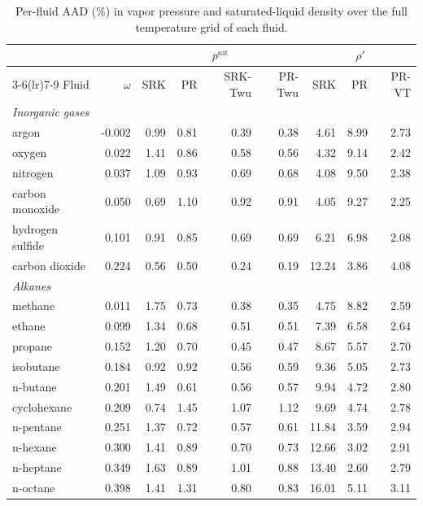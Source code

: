 \begin{table}[H]
\centering
\caption{Per-fluid AAD (\%) in vapor pressure and saturated-liquid density over the full temperature grid of each fluid.}
\label{tab:perfluid}
\footnotesize
\setlength{\tabcolsep}{4pt}
\begin{tabular}{lrrrrrrrr}
\toprule
 & & \multicolumn{4}{c}{$p^{\mathrm{sat}}$} & \multicolumn{3}{c}{$\rho'$} \\
\cmidrule(lr){3-6}\cmidrule(lr){7-9}
Fluid & $\omega$ & SRK & PR & SRK-Twu & PR-Twu & SRK & PR & PR-VT \\
\midrule
\multicolumn{9}{l}{\itshape Inorganic gases}\\
\quad argon & -0.002 & 0.99 & 0.81 & 0.39 & 0.38 & 4.61 & 8.99 & 2.73 \\
\quad oxygen & 0.022 & 1.41 & 0.86 & 0.58 & 0.56 & 4.32 & 9.14 & 2.42 \\
\quad nitrogen & 0.037 & 1.09 & 0.93 & 0.69 & 0.68 & 4.08 & 9.50 & 2.38 \\
\quad carbon monoxide & 0.050 & 0.69 & 1.10 & 0.92 & 0.91 & 4.05 & 9.27 & 2.25 \\
\quad hydrogen sulfide & 0.101 & 0.91 & 0.85 & 0.69 & 0.69 & 6.21 & 6.98 & 2.08 \\
\quad carbon dioxide & 0.224 & 0.56 & 0.50 & 0.24 & 0.19 & 12.24 & 3.86 & 4.08 \\
\multicolumn{9}{l}{\itshape Alkanes}\\
\quad methane & 0.011 & 1.75 & 0.73 & 0.38 & 0.35 & 4.75 & 8.82 & 2.59 \\
\quad ethane & 0.099 & 1.34 & 0.68 & 0.51 & 0.51 & 7.39 & 6.58 & 2.64 \\
\quad propane & 0.152 & 1.20 & 0.70 & 0.45 & 0.47 & 8.67 & 5.57 & 2.70 \\
\quad isobutane & 0.184 & 0.92 & 0.92 & 0.56 & 0.59 & 9.36 & 5.05 & 2.73 \\
\quad n-butane & 0.201 & 1.49 & 0.61 & 0.56 & 0.57 & 9.94 & 4.72 & 2.80 \\
\quad cyclohexane & 0.209 & 0.74 & 1.45 & 1.07 & 1.12 & 9.69 & 4.74 & 2.78 \\
\quad n-pentane & 0.251 & 1.37 & 0.72 & 0.57 & 0.61 & 11.84 & 3.59 & 2.94 \\
\quad n-hexane & 0.300 & 1.41 & 0.89 & 0.70 & 0.73 & 12.66 & 3.02 & 2.91 \\
\quad n-heptane & 0.349 & 1.63 & 0.89 & 1.01 & 0.88 & 13.40 & 2.60 & 2.79 \\
\quad n-octane & 0.398 & 1.41 & 1.31 & 0.80 & 0.83 & 16.01 & 5.11 & 3.11 \\

\end{tabular}
\end{table}
